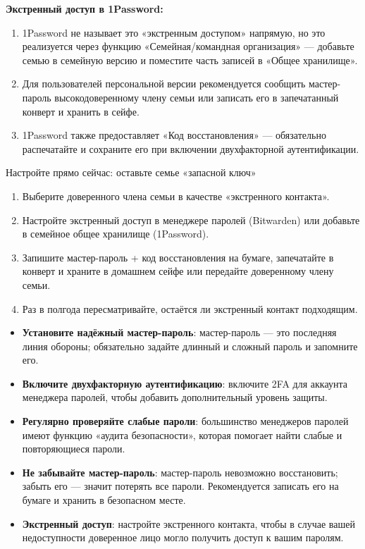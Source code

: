 \textbf{Экстренный доступ в 1Password:}

\begin{enumerate}
  \item 1Password не называет это «экстренным доступом» напрямую, но это реализуется через функцию «Семейная/командная организация» — добавьте семью в семейную версию и поместите часть записей в «Общее хранилище».
  \item Для пользователей персональной версии рекомендуется сообщить мастер-пароль высокодоверенному члену семьи или записать его в запечатанный конверт и хранить в сейфе.
  \item 1Password также предоставляет «Код восстановления» — обязательно распечатайте и сохраните его при включении двухфакторной аутентификации.
\end{enumerate}

\begin{tcbpractice}{Настройте прямо сейчас: оставьте семье «запасной ключ»}
\begin{enumerate}
  \item Выберите доверенного члена семьи в качестве «экстренного контакта».
  \item Настройте экстренный доступ в менеджере паролей (Bitwarden) или добавьте в семейное общее хранилище (1Password).
  \item Запишите мастер-пароль + код восстановления на бумаге, запечатайте в конверт и храните в домашнем сейфе или передайте доверенному члену семьи.
  \item Раз в полгода пересматривайте, остаётся ли экстренный контакт подходящим.
\end{enumerate}

\end{tcbpractice}


\begin{itemize}
  \item \textbf{Установите надёжный мастер-пароль}: мастер-пароль — это последняя линия обороны; обязательно задайте длинный и сложный пароль и запомните его.
  \item \textbf{Включите двухфакторную аутентификацию}: включите 2FA для аккаунта менеджера паролей, чтобы добавить дополнительный уровень защиты.
  \item \textbf{Регулярно проверяйте слабые пароли}: большинство менеджеров паролей имеют функцию «аудита безопасности», которая помогает найти слабые и повторяющиеся пароли.
  \item \textbf{Не забывайте мастер-пароль}: мастер-пароль невозможно восстановить; забыть его — значит потерять все пароли. Рекомендуется записать его на бумаге и хранить в безопасном месте.
  \item \textbf{Экстренный доступ}: настройте экстренного контакта, чтобы в случае вашей недоступности доверенное лицо могло получить доступ к вашим паролям.
\end{itemize}

